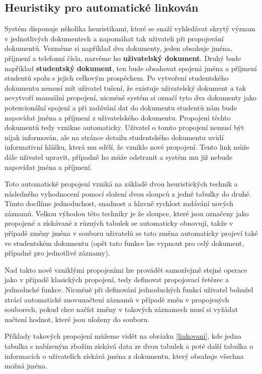 \subsection{Heuristiky pro automatické linkován}
\par Systém disponuje několika heuristikami, které se snaží vyhledávat skrytý význam v jednotlivých dokumentech a napomáhat tak uživateli při propojování dokumentů. Vezměme si například dva dokumenty, jeden obsahuje jména, příjmení a telefonní čísla, nazvěme ho \textbf{uživatelský dokument}. Druhý bude například \textbf{studentský dokument}, ten bude obsahovat spojená jména a příjmení studentů spolu s jejich celkovým prospěchem. Po vytvoření studentského dokumentu nemusí mít uživatel tušení, že existuje uživatelský dokument a tak nevytvoří manuální propojení, nicméně systém si označí tyto dva dokumenty jako potencionální spojení a při zadávání dat do dokumentu studentů nám bude napovídat jména a příjmení z uživatelského dokumentu. Propojení těchto dokumentů tedy vznikne automaticky. Uživatel o tomto propojení nemusí být nijak informován, ale na stránce detailu studentského dokumentu uvidí informativní hlášku, která mu sdělí, že vzniklo nové propojení. Tento link může dále uživatel upravit, případně ho může odstranit a systém mu již nebude napovídat jména a příjmení.

\par Toto automatické propojení vzniká na základě dvou heuristických technik a následného vyhodnocení pomocí složení dvou sloupců z jedné tabulky do druhé. Tímto docílíme jednoduchost, snadnost a hlavně rychlost zadávání nových záznamů. Velkou výhodou této techniky je že sloupce, které jsou označeny jako propojené a získávané z různých tabulek se automaticky obnovují, takže v případě změny jména v souboru uživatelů se tato změna automaticky projeví také ve studentském dokumentu (opět tato funkce lze vypnout pro celý dokument, případně pro jednotlivé záznamy).

\par Nad takto nově vzniklými propojeními lze provádět samozřejmě stejné operace jako v případě klasických propojení, tedy definovat propojovací řetězec a jednoduché funkce. Nicméně při definování jednoduchých funkcí uživatel bohužel ztrácí automatické znovunačtení záznamů v případě změn v propojených souborech, pokud chce načíst změny v takových záznamech musí si vyžádat načtení hodnot, které jsou uloženy do souboru.

\par Příklady takových propojení můžeme vidět na obrázku \ref{linkovani}, kde jedna tabulka s nabízeným zbožím získává data ze dvou tabulek a poté další tabulka o informacích o uživatelích získává jména z dokumentu, který obsahuje všechna možná jména.

